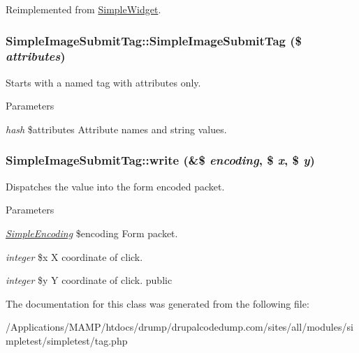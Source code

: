 Reimplemented from \hyperlink{class_simple_widget_a9e048a450e2d29a601e672deda9fa869}{SimpleWidget}.\hypertarget{class_simple_image_submit_tag_abcccdd6803d3460d5ed4a0c7e1b54d2d}{
\subsubsection[{SimpleImageSubmitTag}]{\setlength{\rightskip}{0pt plus 5cm}SimpleImageSubmitTag::SimpleImageSubmitTag (\$ {\em attributes})}}
\label{class_simple_image_submit_tag_abcccdd6803d3460d5ed4a0c7e1b54d2d}
Starts with a named tag with attributes only. 
\begin{DoxyParams}{Parameters}
\item[{\em hash}]\$attributes Attribute names and string values. \end{DoxyParams}
\hypertarget{class_simple_image_submit_tag_ac00f37c50fa16598fbefc7964de0833f}{
\subsubsection[{write}]{\setlength{\rightskip}{0pt plus 5cm}SimpleImageSubmitTag::write (\&\$ {\em encoding}, \/  \$ {\em x}, \/  \$ {\em y})}}
\label{class_simple_image_submit_tag_ac00f37c50fa16598fbefc7964de0833f}
Dispatches the value into the form encoded packet. 
\begin{DoxyParams}{Parameters}
\item[{\em \hyperlink{class_simple_encoding}{SimpleEncoding}}]\$encoding Form packet. \item[{\em integer}]\$x X coordinate of click. \item[{\em integer}]\$y Y coordinate of click.  public \end{DoxyParams}


The documentation for this class was generated from the following file:\begin{DoxyCompactItemize}
\item 
/Applications/MAMP/htdocs/drump/drupalcodedump.com/sites/all/modules/simpletest/simpletest/tag.php\end{DoxyCompactItemize}
